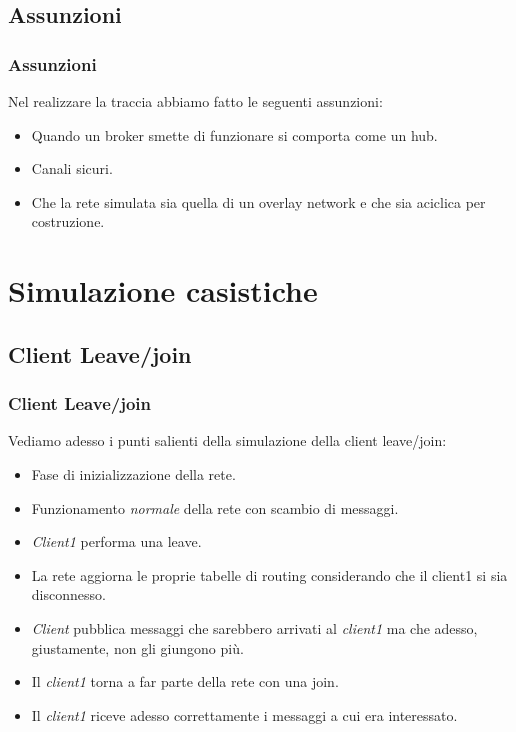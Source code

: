 \documentclass{beamer}
\begin{document}
\subsection{Assunzioni}

\begin{frame}
	\frametitle{Assunzioni}
	
	Nel realizzare la traccia abbiamo fatto le seguenti assunzioni:
	\begin{itemize}
		\item Quando un broker smette di funzionare si comporta come un hub.
		\item Canali sicuri.
		\item Che la rete simulata sia quella di un overlay network e che sia aciclica per costruzione.
	\end{itemize}
\end{frame}



\section{Simulazione casistiche}
\subsection{Client Leave/join}

\begin{frame}
\frametitle{Client Leave/join}

Vediamo adesso i punti salienti della simulazione della client leave/join:
\begin{itemize}
	\item Fase di inizializzazione della rete.
	\item Funzionamento \emph{normale} della rete con scambio di messaggi.
	\item \emph{Client1} performa una leave.
	\item La rete aggiorna le proprie tabelle di routing considerando che il client1 si sia disconnesso.
	\item \emph{Client} pubblica messaggi che sarebbero arrivati al \emph{client1} ma che adesso, giustamente, non gli giungono più.
	\item Il \emph{client1} torna a far parte della rete con una join.
	\item Il \emph{client1} riceve adesso correttamente i messaggi a cui era interessato.
\end{itemize}
\end{frame}
\end{document}
